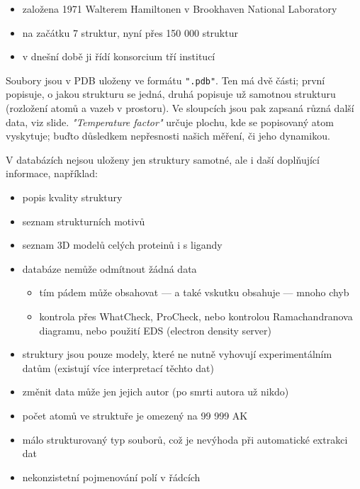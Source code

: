 \documentclass[DIV=8]{scrreprt}
\newcommand{\inlinecode}{\texttt}
\begin{document}
\begin{itemize}
    \item založena 1971 Walterem Hamiltonen v Brookhaven National Laboratory
    \item na začátku 7 struktur, nyní přes 150 000 struktur
    \item v dnešní době ji řídí konsorcium tří institucí
\end{itemize}


Soubory jsou v PDB uloženy ve formátu \inlinecode{".pdb"}. Ten má dvě části; první popisuje, o jakou strukturu se jedná, druhá popisuje už samotnou strukturu (rozložení atomů a vazeb v prostoru). Ve sloupcích jsou pak zapsaná různá další data, viz slide. \emph{"Temperature factor"} určuje plochu, kde se popisovaný atom vyskytuje; buďto důsledkem nepřesnosti našich měření, či jeho dynamikou.

V databázích nejsou uloženy jen struktury samotné, ale i daší doplňující informace, například:
\begin{itemize}
    \item popis kvality struktury
    \item seznam strukturních motivů
    \item seznam 3D modelů celých proteinů i s ligandy
\end{itemize}


\begin{itemize}
    \item databáze nemůže odmítnout žádná data
\begin{itemize}
    \item tím pádem může obsahovat --- a také vskutku obsahuje --- mnoho chyb
    \item kontrola přes WhatCheck, ProCheck, nebo kontrolou Ramachandranova diagramu, nebo použití EDS (electron density server)
\end{itemize}

    \item struktury jsou pouze modely, které ne nutně vyhovují experimentálním datům (existují více interpretací těchto dat)
    \item změnit data může jen jejich autor (po smrti autora už nikdo)
\end{itemize}


\begin{itemize}
    \item počet atomů ve struktuře je omezený na 99 999 AK
    \item málo strukturovaný typ souborů, což je nevýhoda při automatické extrakci dat
    \item nekonzistetní pojmenování polí v řádcích
\end{itemize}
\end{document}
